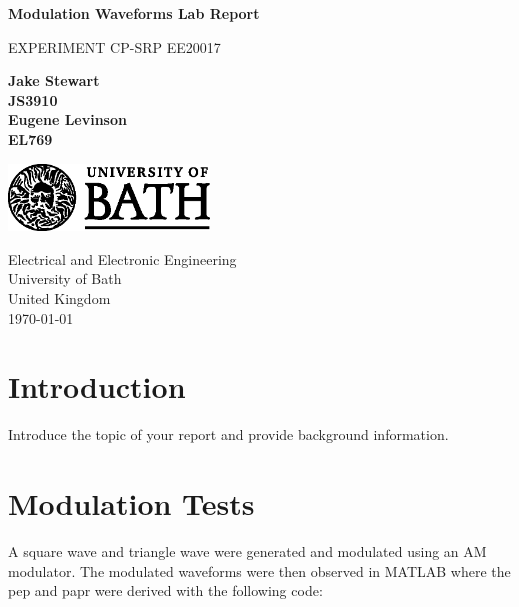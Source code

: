 \documentclass[a4paper]{article}
\begin{document}
\begin{titlepage}
    \begin{center}
        \vspace*{1cm}

        \Huge
        \textbf{Modulation Waveforms Lab Report}

        \vspace{0.5cm}
        \LARGE
        EXPERIMENT CP-SRP
        EE20017
        
        \vspace{1.5cm}

        \textbf{Jake Stewart}\\
        \textbf{JS3910}\\

        \textbf{Eugene Levinson}\\
        \textbf{EL769}\\
        \vspace{0.8cm}

        \vfill
        \includegraphics[width=0.4\textwidth]{university_logo.png}

        \Large
        Electrical and Electronic Engineering\\
        University of Bath\\
        United Kingdom\\
        \today
        

    \end{center}
\end{titlepage}

\newpage
\tableofcontents
\newpage

\section{Introduction}
Introduce the topic of your report and provide background information.

\section{Modulation Tests}
A square wave and triangle wave were generated and modulated using an AM modulator.
The modulated waveforms were then observed in MATLAB where the \gls{pep} and \gls{papr} were derived with the following code:
\end{document}
